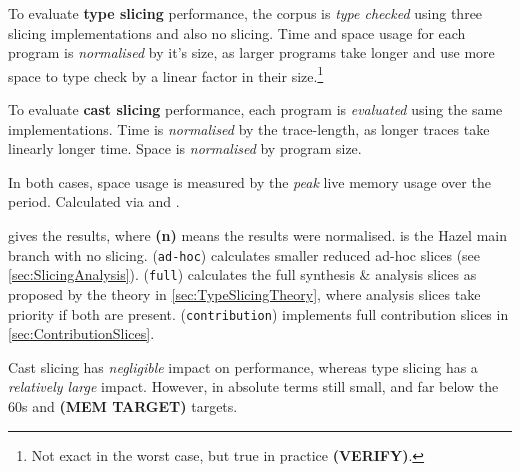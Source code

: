 To evaluate \textbf{type slicing} performance, the corpus is \textit{type checked} using three slicing implementations and also no slicing. Time and space usage for each program is \textit{normalised} by it's size, as larger programs take longer and use more space to type check by a linear factor in their size.\footnote{Not exact in the worst case, but true in practice \textbf{(VERIFY)}.}

To evaluate \textbf{cast slicing} performance, each program is \textit{evaluated} using the same implementations. Time is \textit{normalised} by the trace-length, as longer traces take linearly longer time. Space is \textit{normalised} by program size.

In both cases, space usage is measured by the \textit{peak} live memory usage over the period. Calculated via  and .

 gives the results, where \textbf{(n)} means the results were normalised.  is the Hazel main branch with no slicing.  (\texttt{ad-hoc}) calculates smaller reduced ad-hoc slices (see \cref{sec:SlicingAnalysis}).  (\texttt{full}) calculates the full synthesis \& analysis slices as proposed by the theory in \cref{sec:TypeSlicingTheory}, where analysis slices take priority if both are present.  (\texttt{contribution}) implements full contribution slices in \cref{sec:ContributionSlices}.

Cast slicing has \textit{negligible} impact on performance, whereas type slicing has a \textit{relatively large} impact. However, in absolute terms still small, and far below the 60s and \textbf{(MEM TARGET)} targets.

